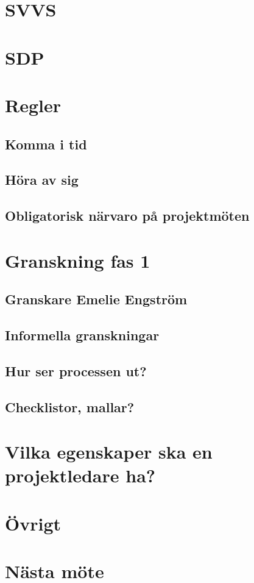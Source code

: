 \documentclass{article}
\begin{document}
\begin{flushleft}
\section{SVVS}
\section{SDP}
\section{Regler}
    \subsection{Komma i tid}
    \subsection{Höra av sig}
    \subsection{Obligatorisk närvaro på projektmöten}
\section{Granskning fas 1}
    \subsection{Granskare Emelie Engström}
    \subsection{Informella granskningar}
    \subsection{Hur ser processen ut?}
    \subsection{Checklistor, mallar?}
\section{Vilka egenskaper ska en projektledare ha?}
\section{Övrigt}
\section{Nästa möte}



\end{flushleft}
\end{document}
